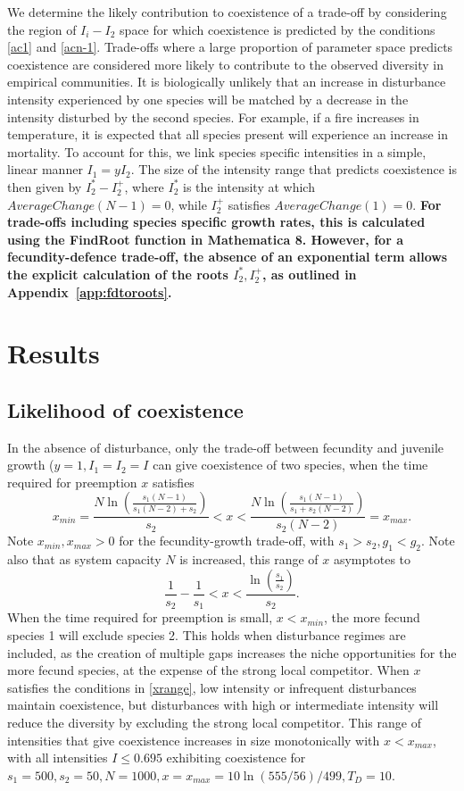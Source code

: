 \documentclass[a4paper]{article}
\begin{document}
We determine the  likely contribution to coexistence of a trade-off by considering the region of $I_i - I_2$ space for which coexistence is predicted by the conditions \eqref{ac1} and \eqref{acn-1}. Trade-offs where a large proportion of parameter space predicts coexistence are considered more likely to contribute to the observed diversity in empirical communities. It is biologically unlikely that an increase in disturbance intensity experienced by one species will be matched by a decrease in the intensity disturbed by the second species. For example, if a fire increases in temperature, it is expected that all species present will experience an increase in mortality. To account for this, we link species specific intensities in a simple, linear manner $I_1=yI_2$. The size of the intensity range that predicts coexistence is then given by $I_2^* - I_2^+$, where $I_2^*$ is the intensity at which $AverageChange(N-1)=0$, while $I_2^+$ satisfies $AverageChange(1)=0$. \textbf{For trade-offs including species specific growth rates, this is calculated using the FindRoot function in Mathematica 8. However, for a fecundity-defence trade-off, the absence of an exponential term allows the explicit calculation of the roots $I_2^*,I_2^+$, as outlined in Appendix~\ref{app:fdtoroots}.}

\section{Results} \label{results}
\subsection{Likelihood of coexistence}
In the absence of disturbance, only the trade-off between fecundity and juvenile growth ($y=1, I_1=I_2=I$ can give coexistence of two species, when the time required for preemption $x$ satisfies
\begin{equation}
\label{xrange}
x_{min}=\frac{N\ln\left(\frac{s_1(N-1)}{s_1(N-2)+s_2}\right)}{s_2}<x<\frac{N\ln\left(\frac{s_1(N-1)}{s_1+s_2(N-2)}\right)}{s_2(N-2)}=x_{max}.
\end{equation}
Note $x_{min},x_{max}>0$ for the fecundity-growth trade-off, with $s_1>s_2, g_1<g_2$. Note also that as system capacity $N$ is increased, this range of $x$ asymptotes to
\begin{equation}
\label{bignxrange}
\frac{1}{s_2}-\frac{1}{s_1}<x<\frac{\ln\left(\frac{s_1}{s_2}\right)}{s_2}.
\end{equation} 
When the time required for preemption is small, $x<x_{min}$, the more fecund species 1 will exclude species 2. This holds when disturbance regimes are included, as the creation of multiple gaps increases the niche opportunities for the more fecund species, at the expense of the strong local competitor. When $x$ satisfies the conditions in \eqref{xrange}, low intensity or infrequent disturbances maintain coexistence, but disturbances with high or intermediate intensity will reduce the diversity by excluding the strong local competitor. This range of intensities that give coexistence increases in size monotonically with $x<x_{max}$, with all intensities $I \leq 0.695$ exhibiting coexistence for $s_1=500,s_2=50,N=1000,x=x_{max}=10 \ln(555/56)/499,T_D=10$.
\end{document}
